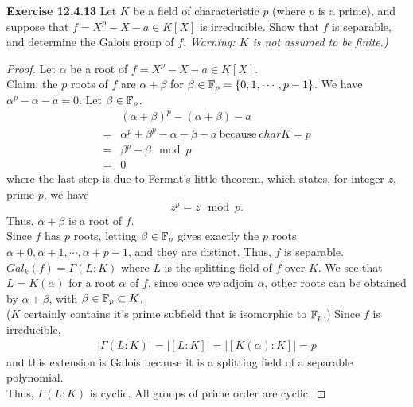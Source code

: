 \documentclass{article}
\begin{document}
\begin{homeworkProblem}
    \textbf{Exercise 12.4.13} Let $K$ be a field of characteristic $p$ (where $p$ is a prime), and suppose 
    that $f = X^p - X -a \in K[X]$ is irreducible. Show that $f$ is separable,
    and determine the Galois group of $f$. 
    \textit{Warning: $K$ is not assumed to be finite.)}\\
    \solution 

    \begin{proof}
        Let $\alpha$ be a root of $f = X^p - X - a \in K[X]$.\\
        Claim: the $p$ roots of $f$ are $\alpha + \beta$ for $\beta \in \mathbb{F}_p = \{ 0,1,\cdots, p-1\}$.
        We have $\alpha^p - \alpha - a = 0.$ Let $\beta \in \mathbb{F}_p$.
        \begin{align}
            &(\alpha+\beta)^p - (\alpha+\beta) - a\\
            =& \alpha^p + \beta^p - \alpha - \beta -a \ \text{because} \ char K = p\\
            =& \beta^p - \beta \mod p \\
            =& 0
        \end{align}
        where the last step is due to Fermat's little theorem, which states, 
        for integer $z$, prime $p$, we have $$z^p = z \mod p.$$
    Thus, $\alpha + \beta$ is a root of $f$.\\
    Since $f$ has $p$ roots, letting $\beta \in \mathbb{F}_p$ gives exactly the $p$ roots 
    $\alpha + 0, \alpha + 1, \cdots, \alpha + p -1$, and they are distinct.
    Thus, $f$ is separable. $Gal_k(f) = \Gamma (L:K)$ where $L$ is the splitting
    field of $f$ over $K$. We see that $L=K(\alpha)$ for a root $\alpha$ of $f$,
    since once we adjoin $\alpha$, other roots can be obtained by $\alpha + \beta$,
    with $\beta \in \mathbb{F}_p \subset K$.\\
    ($K$ certainly contains it's prime subfield that is isomorphic to $\mathbb{F}_p$.)
    Since $f$ is irreducible, 
    \begin{align}
        \lvert \Gamma (L:K) \rvert = \lvert [L:K] \rvert = \lvert [K(\alpha) : K] \rvert = p
    \end{align}
    and this extension is Galois because it is a splitting field of a separable polynomial.\\
    Thus, $\Gamma (L:K)$ is cyclic. All groups of prime order are cyclic.
    \end{proof}
    


\end{homeworkProblem}
\end{document}
